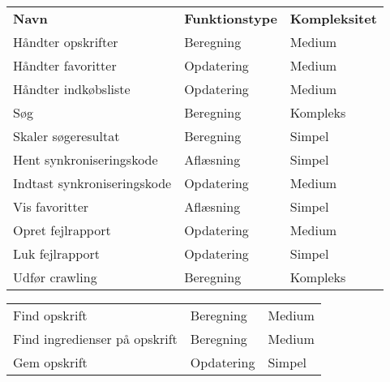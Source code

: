 \begin{table} [H]
    \begin{tabular}{ l|l l }
  \hline
        \textbf{Navn}               & \textbf{Funktionstype} & \textbf{Kompleksitet} \\ %
        Håndter opskrifter          & Beregning              & Medium                \\
        Håndter favoritter          & Opdatering             & Medium                \\
        Håndter indkøbsliste        & Opdatering             & Medium                \\
        Søg                         & Beregning              & Kompleks              \\
        Skaler søgeresultat         & Beregning              & Simpel                \\
        Hent synkroniseringskode    & Aflæsning              & Simpel                \\
        Indtast synkroniseringskode & Opdatering             & Medium                \\
        Vis favoritter              & Aflæsning              & Simpel                \\
        Opret fejlrapport           & Opdatering             & Medium                \\
        Luk fejlrapport             & Opdatering             & Simpel                \\
        Udfør crawling              & Beregning              & Kompleks              \\ \hline
    \end{tabular}
\end{table}

\begin{table} [H]
    \begin{tabular}{ l l l }
    \hline
        Find opskrift                 & Beregning  & Medium \\
        Find ingredienser på opskrift & Beregning  & Medium \\
        Gem opskrift                  & Opdatering & Simpel \\ \hline
    \end{tabular}
\end{table}
